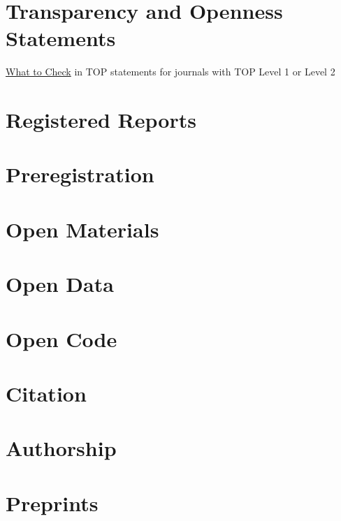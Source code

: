 \documentclass[
  oneside]{book}
\begin{document}
\hypertarget{transparency-and-openness-statements}{%
\chapter{Transparency and Openness Statements}\label{transparency-and-openness-statements}}

\href{https://www.dropbox.com/s/8jv2n0j3mlkhkrj/TOP_GuidanceforReviewers.docx}{What to Check} in TOP statements for journals with TOP Level 1 or Level 2

\hypertarget{registered-reports}{%
\chapter{Registered Reports}\label{registered-reports}}

\hypertarget{preregistration}{%
\chapter{Preregistration}\label{preregistration}}

\hypertarget{open-materials}{%
\chapter{Open Materials}\label{open-materials}}

\hypertarget{open-data}{%
\chapter{Open Data}\label{open-data}}

\hypertarget{open-code}{%
\chapter{Open Code}\label{open-code}}

\hypertarget{citation}{%
\chapter{Citation}\label{citation}}

\hypertarget{authorship}{%
\chapter{Authorship}\label{authorship}}

\hypertarget{preprints}{%
\chapter{Preprints}\label{preprints}}
\end{document}
